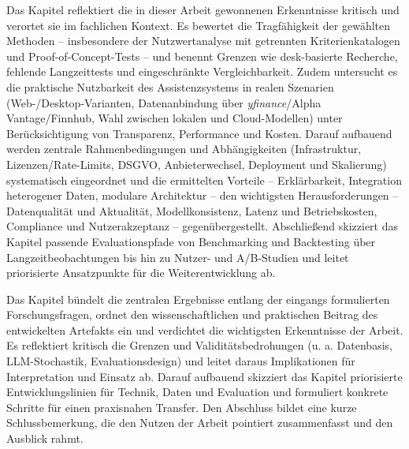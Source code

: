 Das Kapitel \textbf{} reflektiert die in dieser Arbeit gewonnenen Erkenntnisse kritisch und verortet sie im fachlichen Kontext.
Es bewertet die Tragfähigkeit der gewählten Methoden -- insbesondere der Nutzwertanalyse mit getrennten Kriterienkatalogen und Proof-of-Concept-Tests -- und benennt Grenzen wie desk-basierte Recherche, fehlende Langzeittests und eingeschränkte Vergleichbarkeit.
Zudem untersucht es die praktische Nutzbarkeit des Assistenzsystems in realen Szenarien (Web-/Desktop-Varianten, Datenanbindung über \textit{yfinance}/Alpha Vantage/Finnhub, Wahl zwischen lokalen und Cloud-Modellen) unter Berücksichtigung von Transparenz, Performance und Kosten.
Darauf aufbauend werden zentrale Rahmenbedingungen und Abhängigkeiten (Infrastruktur, Lizenzen/Rate-Limits, \acs{DSGVO}, Anbieterwechsel, Deployment und Skalierung) systematisch eingeordnet und die ermittelten Vorteile -- Erklärbarkeit, Integration heterogener Daten, modulare Architektur -- den wichtigsten Herausforderungen -- Datenqualität und Aktualität, Modellkonsistenz, Latenz und Betriebskosten, Compliance und Nutzerakzeptanz -- gegenübergestellt.
Abschließend skizziert das Kapitel passende Evaluationspfade von Benchmarking und Backtesting über Langzeitbeobachtungen bis hin zu Nutzer- und A/B-Studien und leitet priorisierte Ansatzpunkte für die Weiterentwicklung ab.


Das Kapitel \textbf{} bündelt die zentralen Ergebnisse entlang der eingangs formulierten Forschungsfragen, ordnet den wissenschaftlichen und praktischen Beitrag des entwickelten Artefakts ein und verdichtet die wichtigsten Erkenntnisse der Arbeit.
Es reflektiert kritisch die Grenzen und Validitätsbedrohungen (u. a. Datenbasis, \acs{LLM}-Stochastik, Evaluationsdesign) und leitet daraus Implikationen für Interpretation und Einsatz ab.
Darauf aufbauend skizziert das Kapitel priorisierte Entwicklungslinien für Technik, Daten und Evaluation und formuliert konkrete Schritte für einen praxisnahen Transfer.
Den Abschluss bildet eine kurze Schlussbemerkung, die den Nutzen der Arbeit pointiert zusammenfasst und den Ausblick rahmt.


